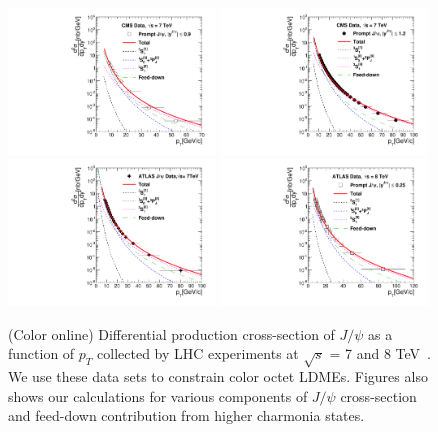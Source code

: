 \documentclass[aps,prc,preprint,superscriptaddress,showpacs,showkeys,amsmath]{revtex4-1}
\begin{document}
\begin{figure}
\includegraphics[width=0.49\textwidth]{Figures/JPsi/CMS_New_D2NDPtDy_PromptJPsi_Y0009_Pt.pdf}
\includegraphics[width=0.49\textwidth]{Figures/JPsi/CMS_Latest_D2NDPtDy_PromptJPsi_Y0012_Pt.pdf}
\includegraphics[width=0.49\textwidth]{Figures/JPsi/ATLAS_New_D2NDPtDy_PromptJPsi_Y0025_Pt.pdf}
\includegraphics[width=0.49\textwidth]{Figures/JPsi/ATLAS_8TeV_D2NDPtDy_PromptJPsi_Y0025_Pt.pdf}
\caption{(Color online) Differential production cross-section of $J/\psi$ as a function of $p_{T}$ 
collected by LHC experiments at $\sqrt{s}$ = 7 and 8 TeV~\cite{Chatrchyan:2011kc,Khachatryan:2015rra,Aad:2015duc}. 
We use these data sets to constrain color octet LDMEs. Figures also shows our calculations for various components 
of $J/\psi$ cross-section and feed-down contribution from higher charmonia states.}
\label{Fig:LDMEJPsi}
\end{figure}
\end{document}
